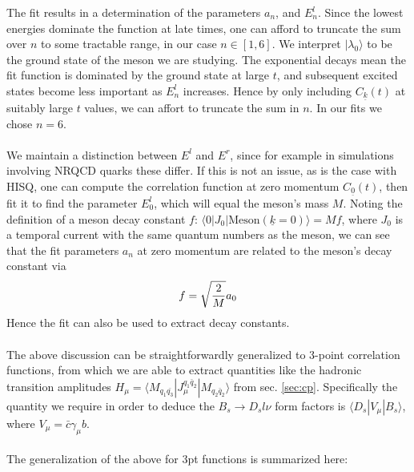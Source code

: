 \documentclass[a4paper,10pt]{article}
\numberwithin{equation}{section}
\begin{document}
The fit results in a determination of the parameters $a_n$, and $E^l_n$. Since the lowest energies dominate the function at late times, one can afford to truncate the sum over $n$ to some tractable range, in our case $n\in[1,6]$. We interpret $|\lambda_0\rangle$ to be the ground state of the meson we are studying. The exponential decays mean the fit function is dominated by the ground state at large $t$, and subsequent excited states become less important as $E^l_n$ increases. Hence by only including $C_{\underline{k}}(t)$ at suitably large $t$ values, we can affort to truncate the sum in $n$. In our fits we chose $n=6$.
\\ \\
We maintain a distinction between $E^l$ and $E^r$, since for example in simulations involving NRQCD quarks these differ. If this is not an issue, as is the case with HISQ, one can compute the correlation function at zero momentum $C_{\underline{0}}(t)$, then fit it to find the parameter $E^l_0$, which will equal the meson's mass $M$. Noting the definition of a meson decay constant $f$: $\langle 0 | J_0 | \text{Meson}(\underline{k}=0) \rangle = M f$, where $J_0$ is a temporal current with the same quantum numbers as the meson, we can see that the fit parameters $a_n$ at zero momentum are related to the meson's decay constant via
\begin{align}
	f = \sqrt{2\over M} a_0
\end{align}
Hence the fit can also be used to extract decay constants.
\\ \\
The above discussion can be straightforwardly generalized to 3-point correlation functions, from which we are able to extract quantities like the hadronic transition amplitudes $H_{\mu} = \langle M_{q_1\bar{q_3}} | J_{\mu}^{q_1\bar{q}_2} | M_{q_2\bar{q}_2} \rangle$ from sec. \ref{sec:cp}. Specifically the quantity we require in order to deduce the $B_{s}\to D_{s} l\nu$ form factors is $\langle D_{s} | V_{\mu} | B_{s} \rangle$, where $V_{\mu}=\bar{c}\gamma_{\mu} b$. 
\\ \\
The generalization of the above for 3pt functions is summarized here:
\end{document}
